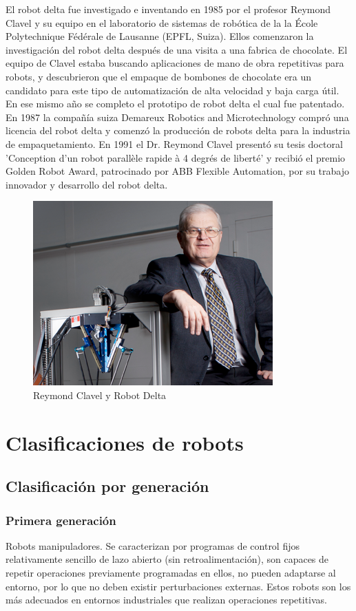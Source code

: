     El robot delta fue investigado e inventando en 1985 por el profesor Reymond Clavel y su equipo en el laboratorio de sistemas de robótica de la la École Polytechnique Fédérale de Lausanne (EPFL, Suiza). Ellos comenzaron la investigación del robot delta después de una visita a una fabrica de chocolate. El equipo de Clavel estaba buscando aplicaciones de mano de obra repetitivas para robots, y descubrieron que el empaque de bombones de chocolate era un candidato para este tipo de automatización de alta velocidad y baja carga útil. En ese mismo año se completo el prototipo de robot delta el cual fue patentado. En 1987 la compañía suiza Demareux Robotics and Microtechnology compró una licencia del robot delta y comenzó la producción de robots delta para la industria de empaquetamiento. En 1991 el Dr. Reymond Clavel presentó su tesis doctoral 'Conception d'un robot parallèle rapide à 4 degrés de liberté' y recibió el premio Golden Robot Award, patrocinado por ABB Flexible Automation, por su trabajo innovador y desarrollo del robot delta.


    \begin{figure}[htb]
        \centering
        \includegraphics[width=0.36\linewidth]{Main/Chapter2/Images2/Reymond-Clavel-Robot-Delta.png}
        \caption{Reymond Clavel y Robot Delta}
        \label{f:Cap2_general_4}
    \end{figure}
    
    
\newpage    
    
\section{Clasificaciones de robots}
    
    \subsection{Clasificación por generación}
        \subsubsection{Primera generación}
            Robots manipuladores. Se caracterizan por programas de control fijos relativamente sencillo de lazo abierto (sin retroalimentación), son capaces de repetir operaciones previamente programadas en ellos, no pueden adaptarse al entorno, por lo que no deben existir perturbaciones externas. Estos robots son los más adecuados en entornos industriales que realizan operaciones repetitivas.
        

